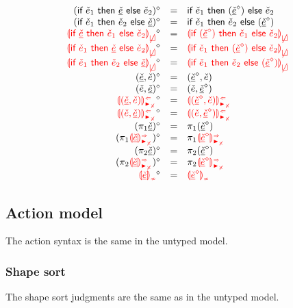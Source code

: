 \documentclass[formalism.tex]{subfiles}
\begin{document}
\[\begin{array}{rcl}
  \cursorErasesToRow{(\ZCIfL{\ECMV_1}{\ZCMV}{\ECMV_2})}{\ECIf{\ECMV_1}{(\cursorErase{\ZCMV})}{\ECMV_2}} \\
  \cursorErasesToRow{(\ZCIfL{\ECMV_1}{\ECMV_2}{\ZCMV})}{\ECIf{\ECMV_1}{\ECMV_2}{(\cursorErase{\ZCMV})}} \\
  \cursorErasesToRow{\ZCInconBrC{\ZCMV}{\ECMV_1}{\ECMV_2}}{\ECInconBr{(\cursorErase{\ZCMV})}{\ECMV_1}{\ECMV_2}} \\
  \cursorErasesToRow{\ZCInconBrL{\ECMV_1}{\ZCMV}{\ECMV_2}}{\ECInconBr{\ECMV_1}{(\cursorErase{\ZCMV})}{\ECMV_2}} \\
  \cursorErasesToRow{\ZCInconBrR{\ECMV_1}{\ECMV_2}{\ZCMV}}{\ECInconBr{\ECMV_1}{\ECMV_2}{(\cursorErase{\ZCMV})}} \\
  \cursorErasesToRow{\ZCPairL{\ZCMV}{\ECMV}}{\ECPair{\cursorErase{\ZCMV}}{\ECMV}} \\
  \cursorErasesToRow{\ZCPairR{\ECMV}{\ZCMV}}{\ECPair{\ECMV}{\cursorErase{\ZCMV}}} \\
  \cursorErasesToRow{\ZCPairAnaNonMatchedProdL{\ZCMV}{\ECMV}}{\ECPairAnaNonMatchedProd{\cursorErase{\ZCMV}}{\ECMV}} \\
  \cursorErasesToRow{\ZCPairAnaNonMatchedProdR{\ECMV}{\ZCMV}}{\ECPairAnaNonMatchedProd{\ECMV}{\cursorErase{\ZCMV}}} \\
  \cursorErasesToRow{(\ZCProjL{\ZCMV})}{\ECProjL{(\cursorErase{\ZCMV})}} \\
  \cursorErasesToRow{(\ZCProjLSynNonMatchedProd{\ZCMV})}{\ECProjLSynNonMatchedProd{\cursorErase{\ZCMV}}} \\
  \cursorErasesToRow{(\ZCProjR{\ZCMV})}{\ECProjR{(\cursorErase{\ZCMV})}} \\
  \cursorErasesToRow{(\ZCProjRSynNonMatchedProd{\ZCMV})}{\ECProjRSynNonMatchedProd{\cursorErase{\ZCMV}}} \\
  \cursorErasesToRow{\ZCInconType{\ZCMV}}{\ECInconType{\cursorErase{\ZCMV}}} \\
\end{array}\]

\subsection{Action model}
\label{sec:typed-action-model}
The action syntax is the same in the untyped model.

\subsubsection{Shape sort}
\label{sec:typed-shape-sort}
The shape sort judgments are the same as in the untyped model.
\end{document}
